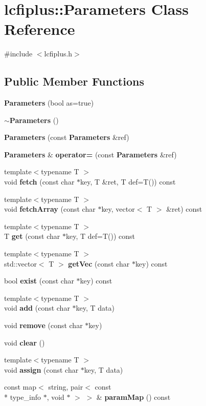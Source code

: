 \section{lcfiplus\-:\-:Parameters Class Reference}
\label{classlcfiplus_1_1Parameters}


{\ttfamily \#include $<$lcfiplus.\-h$>$}

\subsection*{Public Member Functions}
\begin{DoxyCompactItemize}
\item 
{\bf Parameters} (bool as=true)
\item 
{\bf $\sim$\-Parameters} ()
\item 
{\bf Parameters} (const {\bf Parameters} \&ref)
\item 
{\bf Parameters} \& {\bf operator=} (const {\bf Parameters} \&ref)
\item 
{\footnotesize template$<$typename T $>$ }\\void {\bf fetch} (const char $\ast$key, T \&ret, T def=T()) const 
\item 
{\footnotesize template$<$typename T $>$ }\\void {\bf fetch\-Array} (const char $\ast$key, vector$<$ T $>$ \&ret) const 
\item 
{\footnotesize template$<$typename T $>$ }\\T {\bf get} (const char $\ast$key, T def=T()) const 
\item 
{\footnotesize template$<$typename T $>$ }\\std\-::vector$<$ T $>$ {\bf get\-Vec} (const char $\ast$key) const 
\item 
bool {\bf exist} (const char $\ast$key) const 
\item 
{\footnotesize template$<$typename T $>$ }\\void {\bf add} (const char $\ast$key, T data)
\item 
void {\bf remove} (const char $\ast$key)
\item 
void {\bf clear} ()
\item 
{\footnotesize template$<$typename T $>$ }\\void {\bf assign} (const char $\ast$key, T data)
\item 
const map$<$ string, pair$<$ const \\*
type\-\_\-info $\ast$, void $\ast$ $>$ $>$ \& {\bf param\-Map} () const 
\end{DoxyCompactItemize}


